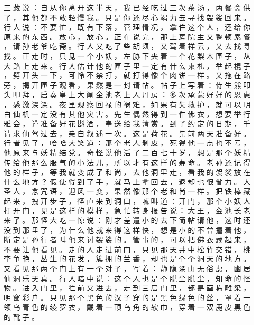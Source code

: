 {三 藏 说 ： 自 从 你 离 开 这 半 天 ， 我 已 经 吃 过 三 次 茶 汤 ， 两 餐 斋 供 了 ， 其 他 都 不 敢 轻 慢 我 。
只 是 你 还 尽 心 竭 力 去 寻 找 袈 裟 回 来 。
行 人 说 ： 不 要 忙 ， 既 有 下 落 ， 管 理 情 况 ， 拿 住 这 个 人 ， 还 给 你 原 来 的 东 西 。
放 心 ， 放 心 。
正 在 说 完 ， 那 上 房 院 主 又 整 顿 素 餐 ， 请 孙 老 爷 吃 斋 。
行 人 又 吃 了 些 胡 须 ， 又 驾 着 祥 云 ， 又 去 找 寻 找 。
正 走 时 ， 只 见 一 个 小 妖 ， 左 胁 下 夹 着 一 个 花 梨 木 匣 子 ， 从 大 路 上 走 来 。
行 人 估 计 他 的 匣 子 里 一 定 有 什 么 柬 札 ， 举 起 棍 子 ， 劈 开 头 一 下 ， 可 怜 不 禁 打 ， 就 打 得 像 个 肉 饼 一 样 。
又 拖 在 路 旁 ， 揭 开 匣 子 观 看 ， 果 然 是 一 封 请 帖 。
帖 子 上 写 着 ： 侍 生 熊 叩 头 叩 拜 ， 启 奏 皇 上 大 阐 金 池 老 上 人 丹 房 ： 多 次 承 蒙 好 好 的 恩 惠 ， 感 激 深 深 。
夜 里 观 察 回 禄 的 祸 难 ， 如 果 有 失 救 护 ， 就 可 以 明 白 仙 机 一 定 没 有 其 他 灾 害 。
先 生 偶 然 得 到 一 件 佛 衣 ， 想 要 举 行 雅 会 ， 谨 准 备 好 花 斟 酒 ， 奉 送 给 我 清 赏 。
到 了 约 定 的 日 期 ， 千 请 求 仙 驾 过 去 ， 亲 自 叙 述 一 次 。
这 是 荷 花 。
先 前 两 天 准 备 好 。
行 者 见 了 ， 哈 哈 大 笑 道 ： 那 个 老 人 剥 皮 ， 死 得 他 一 点 也 不 亏 ， 他 原 来 与 妖 精 结 党 。
奇 怪 说 他 活 了 二 百 七 十 岁 ， 想 是 那 个 妖 精 传 给 他 那 么 服 气 的 小 法 儿 ， 所 以 才 有 这 样 的 寿 命 。
老 孙 还 记 得 他 的 样 子 ， 等 我 就 变 成 了 和 尚 ， 去 他 洞 里 走 ， 看 我 的 袈 裟 放 在 什 么 地 方 ？
假 使 得 到 了 手 ， 就 马 上 拿 回 去 ， 退 却 也 很 省 力 。
大 圣 人 ， 念 咒 语 ， 迎 风 一 变 ， 果 然 像 那 个 老 和 尚 一 样 。
把 铁 棒 藏 起 来 ， 拽 开 步 子 ， 径 直 来 到 洞 口 ， 喊 叫 道 ： 开 门 ， 那 个 小 妖 人 打 开 门 ， 见 是 这 样 的 模 样 ， 急 忙 转 身 报 告 说 ： 大 王 ， 金 池 长 老 来 了 。
那 怪 大 吃 一 惊 说 ： 刚 才 差 遣 小 的 去 下 简 帖 请 他 ， 这 时 还 没 到 那 里 了 ， 为 什 么 他 就 来 得 这 样 快 ， 想 是 小 的 不 曾 撞 着 他 ， 断 定 是 孙 行 者 叫 他 来 讨 袈 裟 的 。
管 事 的 ， 可 以 把 佛 衣 藏 起 来 ， 不 要 让 他 看 见 。
走 的 人 走 进 前 门 ， 只 见 那 天 井 中 松 竹 交 错 ， 桃 李 争 艳 ， 丛 生 的 花 发 ， 簇 拥 的 兰 香 ， 却 也 是 个 个 洞 天 的 地 方 。
又 看 见 那 两 个 门 上 有 一 个 对 子 ， 写 着 ： 静 隐 深 山 无 俗 虑 ， 幽 居 仙 洞 乐 天 真 。
行 人 暗 中 说 ： 这 个 人 也 是 个 脱 尘 脱 尘 ， 知 命 的 怪 物 。
进 入 门 里 ， 往 前 又 进 去 ， 走 到 三 层 门 里 ， 都 是 画 栋 雕 梁 ， 明 窗 彩 户 。
只 见 那 个 黑 色 的 汉 子 穿 的 是 黑 色 绿 色 的 丝 ， 罩 着 一 领 乌 青 色 的 绫 罗 衣 ， 戴 着 一 顶 乌 角 的 软 巾 ， 穿 着 一 双 鹿 皮 黑 色 的 靴 子 。
}
